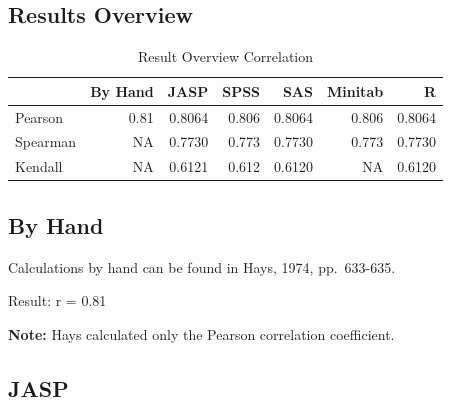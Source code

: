 \documentclass[
]{book}
\begin{document}
\hypertarget{results-overview}{%
\subsection{Results Overview}\label{results-overview}}

\begin{table}

\caption{\label{tab:unnamed-chunk-85}Result Overview Correlation}
\centering
\begin{tabular}[t]{lrrrrrr}
\toprule
  & By Hand & JASP & SPSS & SAS & Minitab & R\\
\midrule
Pearson & 0.81 & 0.8064 & 0.806 & 0.8064 & 0.806 & 0.8064\\
Spearman & NA & 0.7730 & 0.773 & 0.7730 & 0.773 & 0.7730\\
Kendall & NA & 0.6121 & 0.612 & 0.6120 & NA & 0.6120\\
\bottomrule
\end{tabular}
\end{table}

\hypertarget{by-hand}{%
\subsection{By Hand}\label{by-hand}}

Calculations by hand can be found in Hays, 1974, pp.~633-635.

Result: r = 0.81

\textbf{Note:} Hays calculated only the Pearson correlation coefficient.

\hypertarget{jasp}{%
\subsection{JASP}\label{jasp}}
\end{document}
